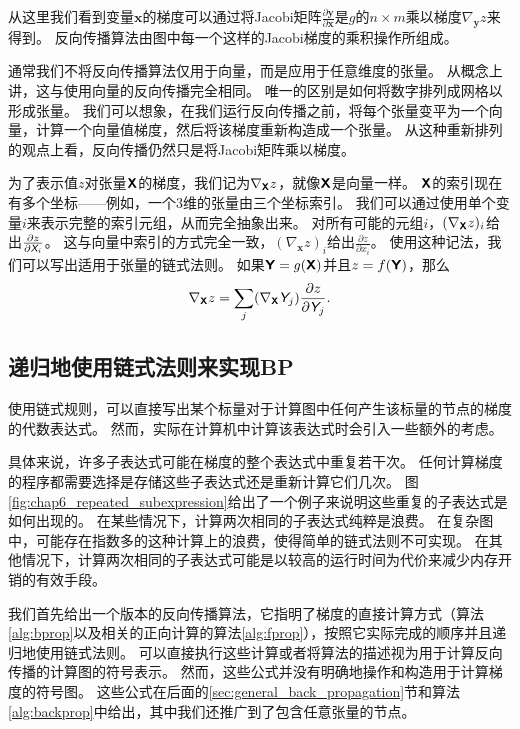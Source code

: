 从这里我们看到变量$\bm{x}$的梯度可以通过将Jacobi矩阵$\frac{\partial \bm{y}}{\partial \bm{x}}$是$g$的$n\times m$乘以梯度$\nabla_{\bm{y}} z$来得到。
反向传播算法由图中每一个这样的Jacobi梯度的乘积操作所组成。


通常我们不将反向传播算法仅用于向量，而是应用于任意维度的张量。
从概念上讲，这与使用向量的反向传播完全相同。 
唯一的区别是如何将数字排列成网格以形成张量。 
我们可以想象，在我们运行反向传播之前，将每个张量变平为一个向量，计算一个向量值梯度，然后将该梯度重新构造成一个张量。
从这种重新排列的观点上看，反向传播仍然只是将Jacobi矩阵乘以梯度。


为了表示值$z$对张量$\textsf{\textbf{X}}$的梯度，我们记为$\nabla_{\textsf{\textbf{X}}} z$，就像$\textsf{\textbf{X}}$是向量一样。
$\textsf{\textbf{X}}$的索引现在有多个坐标——例如，一个3维的张量由三个坐标索引。
我们可以通过使用单个变量$i$来表示完整的索引元组，从而完全抽象出来。
对所有可能的元组$i$，$(\nabla_{\textsf{\textbf{X}}} z)_i$给出$\frac{\partial z}{\partial \textit{\textsf{X}}_i}$。
这与向量中索引的方式完全一致，$(\nabla_{\bm{x}} z)_i$给出$\frac{\partial z}{\partial x_i}$。
使用这种记法，我们可以写出适用于张量的链式法则。
如果$\textsf{\textbf{Y}}=g(\textsf{\textbf{X}})$并且$z=f(\textsf{\textbf{Y}})$，那么
\begin{equation}
  \nabla_{\textsf{\textbf{X}}} z = \sum_j (\nabla_{\textsf{\textbf{X}}} \textit{\textsf{Y}}_j)\frac{\partial z}{\partial \textit{\textsf{Y}}_j}.
  \label{eq:6.47}
\end{equation}

\subsection{递归地使用链式法则来实现BP}
\label{sec:recursively_applying_the_chain_rule_to_obtain_backprop}

使用链式规则，可以直接写出某个标量对于计算图中任何产生该标量的节点的梯度的代数表达式。
然而，实际在计算机中计算该表达式时会引入一些额外的考虑。

具体来说，许多子表达式可能在梯度的整个表达式中重复若干次。
任何计算梯度的程序都需要选择是存储这些子表达式还是重新计算它们几次。
图\ref{fig:chap6_repeated_subexpression}给出了一个例子来说明这些重复的子表达式是如何出现的。
在某些情况下，计算两次相同的子表达式纯粹是浪费。
在复杂图中，可能存在指数多的这种计算上的浪费，使得简单的链式法则不可实现。
在其他情况下，计算两次相同的子表达式可能是以较高的运行时间为代价来减少内存开销的有效手段。

我们首先给出一个版本的反向传播算法，它指明了梯度的直接计算方式（算法\ref{alg:bprop}以及相关的正向计算的算法\ref{alg:fprop}），按照它实际完成的顺序并且递归地使用链式法则。
可以直接执行这些计算或者将算法的描述视为用于计算反向传播的计算图的符号表示。
然而，这些公式并没有明确地操作和构造用于计算梯度的符号图。
这些公式在后面的\ref{sec:general_back_propagation}节和算法\ref{alg:backprop}中给出，其中我们还推广到了包含任意张量的节点。

